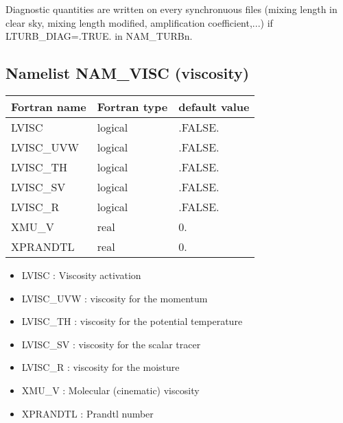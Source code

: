 Diagnostic quantities are written on every synchronuous files 
(mixing length in clear sky, mixing length modified, amplification coefficient,...) if LTURB\_DIAG=.TRUE. in NAM\_TURBn.
\subsection{Namelist NAM\_VISC (viscosity)}
\begin{center}
\begin{tabular}{|l|l|l| }
\hline 
 Fortran name  & Fortran type  & default value \\
\hline
 LVISC & logical       & .FALSE.           \\
 LVISC\_UVW & logical       & .FALSE.           \\
 LVISC\_TH & logical       & .FALSE.           \\
 LVISC\_SV & logical       & .FALSE.           \\
 LVISC\_R & logical       & .FALSE.           \\
 XMU\_V & real       & 0.           \\
 XPRANDTL & real       & 0.           \\
\hline
\end{tabular}
\end{center}

\begin{itemize}
\item   {}
LVISC : Viscosity activation

\item   {}
LVISC\_UVW : viscosity for the momentum

\item   {}
LVISC\_TH : viscosity for the potential temperature

\item   {}
LVISC\_SV : viscosity for the scalar tracer

\item   {}
LVISC\_R : viscosity for the moisture
 
\item   {}
XMU\_V : Molecular (cinematic) viscosity

\item   {}
XPRANDTL : Prandtl number

\end{itemize}

